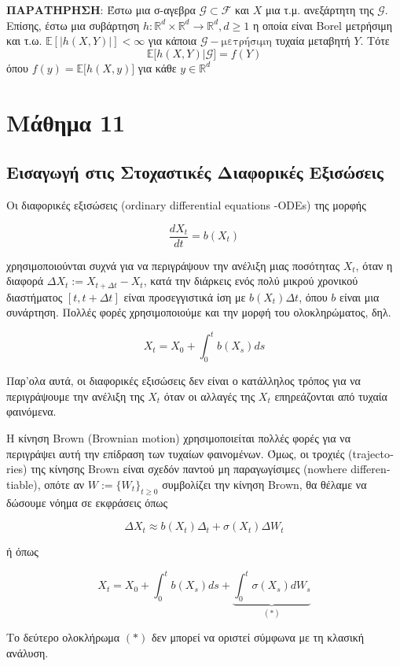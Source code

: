 \documentclass[12pt,a4paper]{article}
\theoremstyle{definition}
\numberwithin{equation}{section}
\begin{document}
\textbf{ΠΑΡΑΤΗΡΗΣΗ}: Έστω μια σ-αγεβρα \(\mathcal{G}\subset \mathcal{F}\) και \(X\) μια τ.μ. ανεξάρτητη της \(\mathcal{G}\). Επίσης, έστω μια συβάρτηση \(h: \mathbb{R}^d \times \mathbb{R}^d \rightarrow \mathbb{R}^d, d \geq 1\) η οποία είναι
\textlatin{Borel} μετρήσιμη και τ.ω. \(\mathbb{E}[|h(X,Y)|] < \infty\) για κάποια \(\mathcal{G}-\text{μετρήσιμη}\) τυχαία μεταβητή \(Y\). Τότε
$$ \mathbb{E}\big[ h(X,Y) | \mathcal{G} \big]  = f(Y)$$
όπου \(f(y) = \mathbb{E}\big[h(X,y)\big]\) για κάθε \(y \in \mathbb{R}^d\)

\pagebreak

\section{Μάθημα 11}
\label{sec:org1070ff4}

\subsection{Εισαγωγή στις Στοχαστικές Διαφορικές Εξισώσεις}
\label{sec:org7b7b053}

Οι διαφορικές εξισώσεις \textlatin{(ordinary differential equations -ODEs)} της μορφής

$$ \frac{dX_t}{dt} = b(X_t) $$

χρησιμοποιούνται συχνά για να περιγράψουν την ανέλιξη μιας ποσότητας \(X_t\), όταν η διαφορά \(\Delta X_t := X_{t+\Delta t} - X_t\), κατά την διάρκεις ενός πολύ μικρού χρονικού διαστήματος \([t, t+\Delta t]\) είναι προσεγγιστικά ίση με \(b(X_t)\Delta t\), όπου \(b\) είναι μια συνάρτηση. Πολλές φορές χρησιμοποιούμε και
την μορφή του ολοκληρώματος, δηλ.

$$ X_t = X_0 + \int_0^t b(X_s)ds $$

Παρ'ολα αυτά, οι διαφορικές εξισώσεις δεν είναι ο κατάλληλος τρόπος για να περιγράψουμε την ανέλιξη της \(X_t\) όταν οι αλλαγές της \(X_t\)
επηρεάζονται από τυχαία φαινόμενα.

Η κίνηση \textlatin{Brown (Brownian motion)} χρησιμοποιείται πολλές φορές για να περιγράψει αυτή την επίδραση των τυχαίων φαινομένων.
Όμως, οι τροχιές \textlatin{(trajectories)} της κίνησης \textlatin{Brown} είναι σχεδόν παντού μη παραγωγίσιμες \textlatin{(nowhere differentiable)}, οπότε αν \(W:= \{W_t\}_{t\geq 0}\) συμβολίζει την κίνηση \textlatin{Brown}, θα θέλαμε να δώσουμε νόημα σε εκφράσεις
όπως

$$ \Delta X_t \approx b(X_t) \Delta_t + \sigma (X_t) \Delta W_t$$

ή όπως

$$X_t = X_0 + \int_0^t b(X_s) ds + \underbrace{\int_0^t \sigma(X_s) dW_s}_{(*)} $$

Το δεύτερο ολοκλήρωμα \((*)\)  δεν μπορεί να οριστεί σύμφωνα με τη κλασική ανάλυση.
\end{document}
